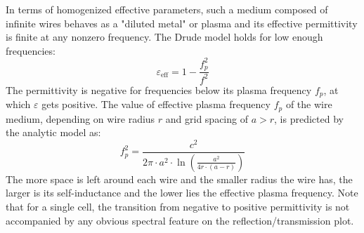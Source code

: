 \documentclass[letterpaper,12pt]{report}
\begin{document}
In terms of homogenized effective parameters, such a medium composed of infinite wires behaves as a "diluted metal" or plasma and its effective permittivity is finite at any nonzero frequency. The Drude model holds for low enough frequencies:
\begin{equation} \varepsilon_{\text{eff}} = 1 - \frac{f_{p}^{2}}{f^{2}} \label{eq_metaleps}\end{equation}
The permittivity is negative for frequencies below its plasma frequency $f_p$, at which $\varepsilon$ gets positive. The value of effective plasma frequency $f_p$ of the wire medium, depending on wire radius $r$ and grid spacing of $a>r$, is predicted by the analytic model\cite{maslovski2002wire} as:
\begin{equation} f_{p}^{2} = \frac{c^{2}}{2\pi \cdot a^{2} \cdot \ln\left(\frac{a^{2}}{4r \cdot (a-r)}\right)} \label{eq_fp_maslovski}\end{equation}
The more space is left around each wire and the smaller radius the wire has, the larger is its self-inductance and the lower lies the effective plasma frequency. 
Note that for a single cell, the transition from negative to positive permittivity is not accompanied by any obvious spectral feature on the reflection/transmission plot. 
\end{document}
